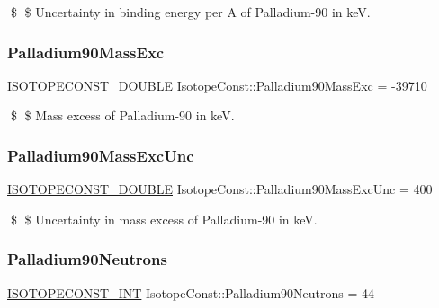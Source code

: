 \$ \$ Uncertainty in binding energy per A of Palladium-\/90 in keV. \mbox{\label{group___isotope_const-_palladium-_pd90_ga31bfa69284300860609f39605be15f83}} 
\subsubsection{\texorpdfstring{Palladium90\+Mass\+Exc}{Palladium90MassExc}}
{\footnotesize\ttfamily \mbox{\hyperlink{group___isotope_const-_macros_ga8f45a7272ce02c0b4c65c44636ed719a}{I\+S\+O\+T\+O\+P\+E\+C\+O\+N\+S\+T\+\_\+\+D\+O\+U\+B\+LE}} Isotope\+Const\+::\+Palladium90\+Mass\+Exc = -\/39710}

\$ \$ Mass excess of Palladium-\/90 in keV. \mbox{\label{group___isotope_const-_palladium-_pd90_ga303144af0f709de18acdfebfda9c11bb}} 
\subsubsection{\texorpdfstring{Palladium90\+Mass\+Exc\+Unc}{Palladium90MassExcUnc}}
{\footnotesize\ttfamily \mbox{\hyperlink{group___isotope_const-_macros_ga8f45a7272ce02c0b4c65c44636ed719a}{I\+S\+O\+T\+O\+P\+E\+C\+O\+N\+S\+T\+\_\+\+D\+O\+U\+B\+LE}} Isotope\+Const\+::\+Palladium90\+Mass\+Exc\+Unc = 400}

\$ \$ Uncertainty in mass excess of Palladium-\/90 in keV. \mbox{\label{group___isotope_const-_palladium-_pd90_gab68d811b9dd299042939facc2c4937c9}} 
\subsubsection{\texorpdfstring{Palladium90\+Neutrons}{Palladium90Neutrons}}
{\footnotesize\ttfamily \mbox{\hyperlink{group___isotope_const-_macros_ga5f18360b3e99483a35c32d789e62621c}{I\+S\+O\+T\+O\+P\+E\+C\+O\+N\+S\+T\+\_\+\+I\+NT}} Isotope\+Const\+::\+Palladium90\+Neutrons = 44}

